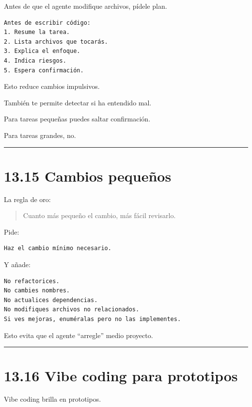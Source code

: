 Antes de que el agente modifique archivos, pídele plan.

\begin{lstlisting}
Antes de escribir código:
1. Resume la tarea.
2. Lista archivos que tocarás.
3. Explica el enfoque.
4. Indica riesgos.
5. Espera confirmación.
\end{lstlisting}

Esto reduce cambios impulsivos.

También te permite detectar si ha entendido mal.

Para tareas pequeñas puedes saltar confirmación.

Para tareas grandes, no.

\begin{center}\rule{0.5\linewidth}{0.5pt}\end{center}

\section{13.15 Cambios pequeños}\label{cambios-pequeuxf1os}

La regla de oro:

\begin{quote}
Cuanto más pequeño el cambio, más fácil revisarlo.
\end{quote}

Pide:

\begin{lstlisting}
Haz el cambio mínimo necesario.
\end{lstlisting}

Y añade:

\begin{lstlisting}
No refactorices.
No cambies nombres.
No actualices dependencias.
No modifiques archivos no relacionados.
Si ves mejoras, enuméralas pero no las implementes.
\end{lstlisting}

Esto evita que el agente ``arregle'' medio proyecto.

\begin{center}\rule{0.5\linewidth}{0.5pt}\end{center}

\section{13.16 Vibe coding para
prototipos}\label{vibe-coding-para-prototipos}

Vibe coding brilla en prototipos.

